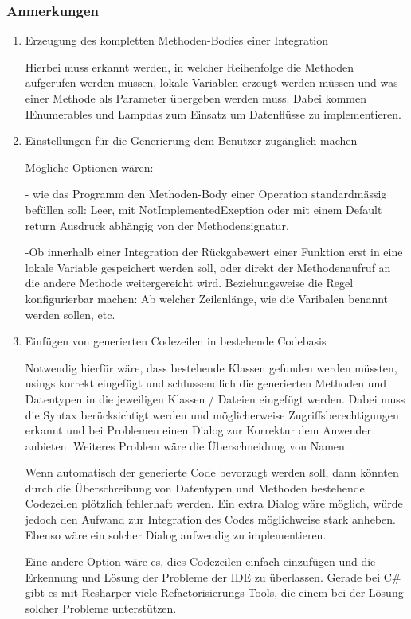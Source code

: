 \documentclass[a4paper,12pt,oneside]{book}
\begin{document}
\subsubsection{Anmerkungen}
\label{sec:orgheadline15}
\begin{enumerate}
\item Erzeugung des kompletten Methoden-Bodies einer Integration

Hierbei muss erkannt werden, in welcher Reihenfolge die Methoden aufgerufen
werden müssen, lokale Variablen erzeugt werden müssen und was einer Methode als Parameter
übergeben werden muss. Dabei kommen IEnumerables und Lampdas zum Einsatz um
Datenflüsse zu implementieren. 

\item Einstellungen für die Generierung dem Benutzer zugänglich machen
\label{sec:orgheadline13}

Mögliche Optionen wären:

- wie das Programm den Methoden-Body einer Operation standardmässig befüllen soll: Leer, mit NotImplementedExeption oder mit einem
Default return Ausdruck abhängig von der Methodensignatur. 

-Ob innerhalb einer Integration der Rückgabewert einer Funktion erst in eine
lokale Variable gespeichert werden soll, oder direkt der Methodenaufruf an die
andere Methode weitergereicht wird. Beziehungsweise die Regel konfigurierbar
machen: Ab welcher Zeilenlänge, wie die Varibalen benannt werden sollen, etc.


\item Einfügen von generierten Codezeilen in bestehende Codebasis
\label{sec:orgheadline14}

Notwendig hierfür wäre, dass bestehende Klassen gefunden werden müssten, usings korrekt
eingefügt und schlussendlich die generierten Methoden und Datentypen in die
jeweiligen Klassen / Dateien eingefügt werden. Dabei muss die Syntax
berücksichtigt werden und möglicherweise Zugriffsberechtigungen erkannt und bei
Problemen einen Dialog zur Korrektur dem Anwender anbieten. Weiteres Problem
wäre die Überschneidung von Namen. 

Wenn automatisch der generierte Code bevorzugt
  werden soll, dann könnten durch die Überschreibung von Datentypen und Methoden
  bestehende Codezeilen plötzlich fehlerhaft werden. Ein extra Dialog wäre
  möglich, würde jedoch den Aufwand zur Integration des Codes möglichweise stark
  anheben. Ebenso wäre ein solcher Dialog aufwendig zu implementieren.
 
  Eine andere Option wäre es, dies Codezeilen einfach einzufügen und die Erkennung und Lösung der
  Probleme der IDE zu überlassen. Gerade bei C\# gibt es mit Resharper viele
  Refactorisierungs-Tools, die einem bei der Lösung solcher Probleme unterstützen.
\end{enumerate}
\end{document}

